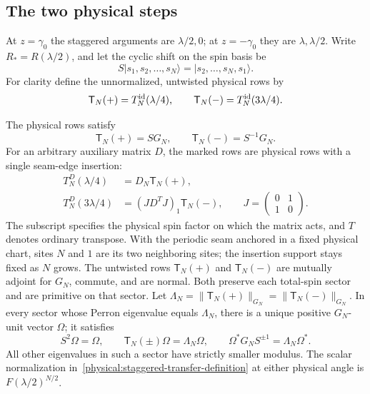 \subsection{The two physical steps}
\label{physical:physical-steps}

At $z=\gamma_0$ the staggered arguments are $\lambda/2,0$; at
$z=-\gamma_0$ they are $\lambda,\lambda/2$. Write $R_*=R(\lambda/2)$,
and let the cyclic shift on the spin basis be
\[
 S|s_1,s_2,\ldots,s_N\rangle
   =|s_2,\ldots,s_N,s_1\rangle.
\]
For clarity define the unnormalized, untwisted physical rows by
\[
 \mathsf T_N(+)=T_N^{\operatorname{id}}(\lambda/4),\qquad
 \mathsf T_N(-)=T_N^{\operatorname{id}}(3\lambda/4).
\]

\begin{lemma}
\label{physical:physical-row-algebra}
The physical rows satisfy
\begin{equation}\label{physical:shift-metric-rows}
 \mathsf T_N(+)=S G_N,\qquad
 \mathsf T_N(-)=S^{-1}G_N.
\end{equation}
For an arbitrary auxiliary matrix $D$, the marked rows are physical
rows with a single seam-edge insertion:
\begin{equation}\label{physical:seam-insertion}
 \begin{aligned}
 T_N^D(\lambda/4)&=D_N\mathsf T_N(+),\\
 T_N^D(3\lambda/4)&=(JD^TJ)_1\mathsf T_N(-),
 \qquad J=\begin{pmatrix}0&1\\1&0\end{pmatrix}.
 \end{aligned}
\end{equation}
The subscript specifies the physical spin factor on which the matrix
acts, and $T$ denotes ordinary transpose. With the periodic seam
anchored in a fixed physical chart, sites $N$ and $1$ are its two
neighboring sites; the insertion support stays fixed as $N$ grows.
The untwisted rows $\mathsf T_N(+)$ and $\mathsf T_N(-)$ are mutually
adjoint for $G_N$, commute, and are normal.
Both preserve each total-spin sector and are primitive on that sector.
Let
$\Lambda_N=\|\mathsf T_N(+)\|_{G_N}=\|\mathsf T_N(-)\|_{G_N}$.
In every sector whose Perron eigenvalue equals $\Lambda_N$, there is a
unique positive $G_N$-unit vector $\Omega$; it satisfies
\begin{equation}\label{physical:Perron-shift-identities}
 S^2\Omega=\Omega,\qquad
 \mathsf T_N(\pm)\Omega=\Lambda_N\Omega,\qquad
 \Omega^*G_NS^{\pm1}=\Lambda_N\Omega^*.
\end{equation}
All other eigenvalues in such a sector have strictly smaller modulus.
The scalar normalization in~\eqref{physical:staggered-transfer-definition}
at either physical angle is $F(\lambda/2)^{N/2}$.
\end{lemma}


